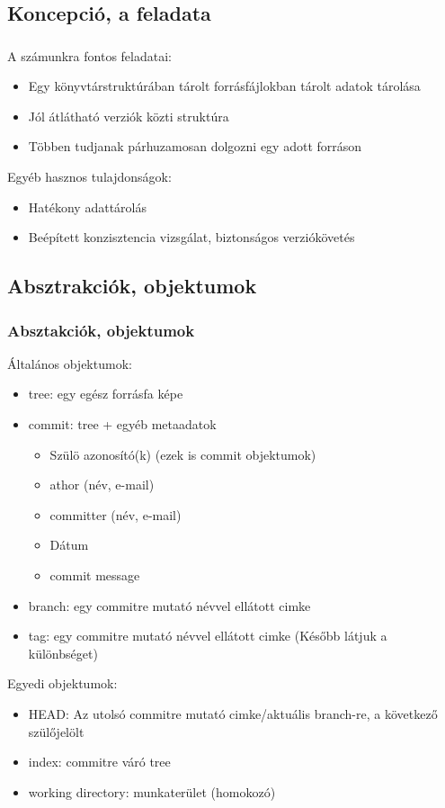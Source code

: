 	\subsection{Koncepció, a \git feladata}
	\begin{frame}
	  \frametitle{\git}
	  A \git számunkra fontos feladatai:
	  \begin{itemize}
	    \item{Egy könyvtárstruktúrában tárolt forrásfájlokban tárolt adatok tárolása}
	    \item{Jól átlátható verziók közti struktúra}
	    \item{Többen tudjanak párhuzamosan dolgozni egy adott forráson}
	  \end{itemize}
	  Egyéb hasznos tulajdonságok:
	  \begin{itemize}
	    \item{Hatékony adattárolás}
	    \item{Beépített konzisztencia vizsgálat, biztonságos verziókövetés}
	  \end{itemize}
	\end{frame}
	\subsection{Absztrakciók, objektumok}
	\begin{frame}
	  \frametitle{Absztakciók, objektumok}
	  Általános objektumok:
	  \begin{itemize}
	    \item{tree: egy egész forrásfa képe}
	    \item{commit: tree + egyéb metaadatok}
	      \begin{itemize}
		\item{Szülö azonosító(k) (ezek is commit objektumok)}
		\item{athor (név, e-mail)}
		\item{committer (név, e-mail)}
		\item{Dátum}
		\item{commit message}
	      \end{itemize}
	    \item{branch: egy commitre mutató névvel ellátott cimke}
	    \item{tag: egy commitre mutató névvel ellátott cimke (Később látjuk a különbséget)}
	  \end{itemize}
	  Egyedi objektumok:
	  \begin{itemize}
	    \item{HEAD: Az utolsó commitre mutató cimke/aktuális branch-re, a következő szülőjelölt}
	    \item{index: commitre váró tree}
	    \item{working directory: munkaterület (homokozó)}
	  \end{itemize}
	\end{frame}
